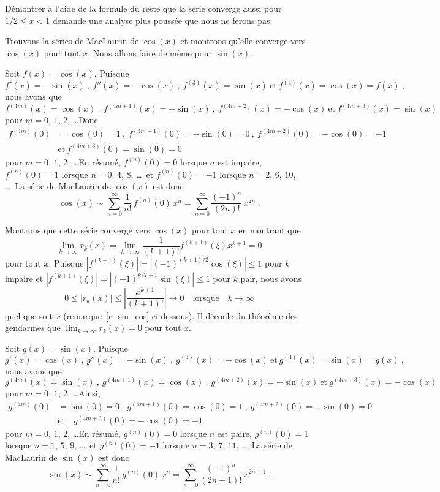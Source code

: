 {\begin{egg}
Démontrer à l'aide de la formule du reste que la série converge aussi pour
$1/2 \leq x <1$ demande une analyse plus poussée que nous ne ferons pas.
\end{egg}

\begin{egg}
Trouvons la séries de MacLaurin de $\cos(x)$ et montrons qu'elle
converge vers $\cos(x)$ pour tout $x$.  Nous allons faire de même pour
$\sin(x)$.

 Soit $f(x) = \cos(x)$.  Puisque
\[
f'(x) = -\sin(x) \ , \ f''(x) = -\cos(x) \ , \ f^{(3)}(x) =
\sin(x) \ \text{et} \ f^{(4)}(x) = \cos(x) = f(x) \ ,
\]
nous avons que
\[
f^{(4m)}(x) = \cos(x) \ , \ f^{(4m+1)}(x) = -\sin(x) \ , \ 
f^{(4m+2)}(x) = -\cos(x) \ \text{et} \ f^{(4m+3)}(x) = \sin(x)
\]
pour $m=0$, $1$, $2$, \ldots\quad  Donc
\begin{align*}
f^{(4m)}(0) &= \cos(0) = 1 \ , \ f^{(4m+1)}(0) = -\sin(0) = 0 \ , \ 
f^{(4m+2)}(0) = -\cos(0) = -1 \\
&\text{et} \ f^{(4m+3)}(0) = \sin(0) = 0
\end{align*}
pour $m=0$, $1$, $2$, \ldots\quad  En résumé, $f^{(n)}(0) = 0$ lorsque $n$ est
impaire, $f^{(n)}(0) = 1$ lorsque $n=0$, $4$, $8$, \ldots \  et
$f^{(n)}(0) = -1$ lorsque $n=2$, $6$, $10$, \ldots \  La série de MacLaurin
de $\cos(x)$ est donc
\[
\cos(x) \sim \sum_{n=0}^\infty \frac{1}{n!}\,f^{(n)}(0) \, x^n
= \sum_{n=0}^\infty \frac{(-1)^n}{(2n)!} \, x^{2n}
\; .
\]

Montrons que cette série converge vers $\cos(x)$ pour tout $x$ en
montrant que
\[
\lim_{k\rightarrow \infty} r_k(x) =
\lim_{k\rightarrow \infty}
\frac{1}{(k+1)!} f^{(k+1)}(\xi) x^{k+1} = 0
\]
pour tout $x$.  Puisque
$\displaystyle \left| f^{(k+1)}(\xi) \right|
= \left| (-1)^{(k+1)/2} \cos(\xi) \right| \leq 1$ pour $k$ impaire et
$\displaystyle \left| f^{(k+1)}(\xi) \right|
= \left| (-1)^{k/2+1} \sin(\xi) \right| \leq 1$ pour $k$ pair, nous avons
\[
0 \leq \left| r_k(x) \right| \leq \left| \frac{x^{k+1}}{(k+1)!} \right|
\rightarrow 0 \quad \text{lorsque} \quad k \rightarrow \infty
\]
quel que soit $x$ (remarque~\ref{r_sin_cos} ci-dessous).  Il
découle du théorème des gendarmes que
$\displaystyle \lim_{k\rightarrow \infty} r_k(x) = 0$ pour tout $x$.

\subQ{ii} Soit $g(x) = \sin(x)$.  Puisque
\[
g'(x) = \cos(x) \ , \ g''(x) = -\sin(x) \ , \ g^{(3)}(x) = -\cos(x) \ 
\text{et} \ g^{(4)}(x) = \sin(x) = g(x) \ , 
\]
nous avons que
\[
g^{(4m)}(x) = \sin(x) \ , \ g^{(4m+1)}(x) = \cos(x) \ , \ g^{(4m+2)}(x) =
-\sin(x) \ \text{et} \ g^{(4m+3)}(x) = -\cos(x)
\]
pour $m=0$, $1$, $2$, \ldots\quad  Ainsi,
\begin{align*}
g^{(4m)}(0) &= \sin(0) = 0 \ , \ g^{(4m+1)}(0) = \cos(0) = 1 \ , \ 
g^{(4m+2)}(0) = -\sin(0) = 0 \\ 
&\text{et} \quad
g^{(4m+3)}(0) = -\cos(0) = -1
\end{align*}
pour $m=0$, $1$, $2$, \ldots\quad  En résumé, $g^{(n)}(0) = 0$ lorsque $n$ est
paire, $g^{(n)}(0) = 1$ lorsque $n=1$, $5$, $9$, \ldots \ et
$g^{(n)}(0) = -1$ lorsque $n=3$, $7$, $11$, \ldots \  La série de MacLaurin
de $\sin(x)$ est donc
\[
\sin(x) \sim \sum_{n=0}^\infty \frac{1}{n!}\,g^{(n)}(0) \, x^n
= \sum_{n=0}^\infty \frac{(-1)^n}{(2n+1)!}\, x^{2n+1}
\; .
\]


\end{egg}}
